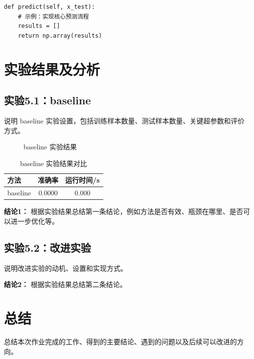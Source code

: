 \documentclass[UTF8,zihao=-4]{ctexart}
\newcommand{\mlExperiment}[2]{\subsection{实验#1：#2}}
\newcommand{\mlConclusion}[1]{\par\noindent\textbf{结论#1：}}
\begin{document}
\begin{lstlisting}
def predict(self, x_test):
    # 示例：实现核心预测流程
    results = []
    return np.array(results)
\end{lstlisting}

\section{实验结果及分析}

\mlExperiment{5.1}{baseline}
说明 baseline 实验设置，包括训练样本数量、测试样本数量、关键超参数和评价方式。

\begin{figure}[H]
  \centering
  \caption{baseline 实验结果}
  \label{fig:baseline}
\end{figure}

\begin{table}[H]
  \centering
  \caption{baseline 实验结果对比}
  \label{tab:baseline}
  \begin{tabular}{lcc}
    \toprule
    方法 & 准确率 & 运行时间/s \\
    \midrule
    baseline & 0.0000 & 0.000 \\
    \bottomrule
  \end{tabular}
\end{table}

\mlConclusion{1}
根据实验结果总结第一条结论，例如方法是否有效、瓶颈在哪里、是否可以进一步优化等。

\mlExperiment{5.2}{改进实验}
说明改进实验的动机、设置和实现方式。

\mlConclusion{2}
根据实验结果总结第二条结论。

\section{总结}
总结本次作业完成的工作、得到的主要结论、遇到的问题以及后续可以改进的方向。

% 
% 
\end{document}
